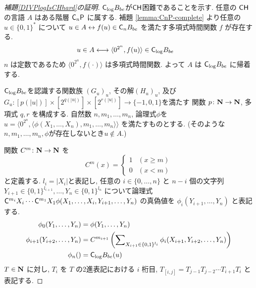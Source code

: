 \begin{proof}[\textup{補題\ref{DIVPlogIsCHhard}の証明}]
 $\mathsf{C}_{\log} B_{be}$が$\mathsf{CH}$困難であることを示す.
 任意の $\mathsf{CH}$ の言語 $A$ はある階層 $\mathsf{C}_n \mathsf{P}$ に属する. 
 補題 \ref{lemma:CnP-complete} より任意の $u \in \{0,1\}^*$ について
 $u \in A \leftrightarrow f(u) \in \mathsf{C}_n B_{be}$ 
 を満たす多項式時間関数 $f$ が存在する.
 \begin{align}
  u \in A 
  & \longleftrightarrow \langle 0^{2^n}, f(u) \rangle \in \mathsf{C}_{\log} B_{be}
 \end{align}
 $n$ は定数であるため $\langle 0^{2^n}, f(\cdot) \rangle$ は多項式時間関数.
 よって $A$ は $\mathsf{C}_{\log} B_{be}$ に帰着する.


 $\mathsf{C}_{\log} B_{be}$を認識する関数族 $(G_u)_u$,  その解$(H_u)_u$,
 及び$G_u \colon [p(|u|)] \times [2^{q(|u|)}] \times [2^{r(|u|)}] \to \{-1, 0, 1\}$を満たす
 関数 $p \colon \mathbf N \to \mathbf N$, 多項式 $q,r$ を構成する.
 自然数 $n, m_1, \dots, m_n$, 論理式$\phi$を
 $u  = \langle 0^{2^n}, 
 \langle \phi(X_1, \dots, X_n), m_1, \dots, m_n \rangle \rangle$
 を満たすものとする. 
 (そのような$n, m_1, \dots, m_n, \phi$が存在しないとき$u \not \in A$.)
 
 
 関数 $C^m \colon \mathbf N \to \mathbf N$ を
 \begin{equation}
  C^m(x) 
     = \begin{cases}
       1 & (x \ge m) \\
       0 & (x < m) \end{cases}
 \end{equation}
 と定義する. 
 $l_i = |X_i|$と表記し,
 任意の $i \in \{0, \dots, n\}$ と $n-i$ 個の文字列 
 $Y_{i+1} \in \{0,1\}^{l_{i+1}}, \dots, Y_n \in \{0,1\}^{l_n}$ 
 について論理式
 $\mathsf{C}^{m_{i}}{X_i} \cdots \mathsf{C}^{m_1}{X_1}
 \phi(X_1, \dots, X_i, Y_{i+1}, \dots, Y_n)$
 の真偽値を $\phi_i(Y_{i+1}, \dots, Y_n)$ と表記する.
 \begin{align}
  \phi_0 (Y_1, \dots, Y_n) &= \phi(Y_1, \dots, Y_n)
  \\ \label{eq:phi-step}
  \phi_{i+1}(Y_{i+2}, \dots, Y_n) 
  &= C^{m_{i+1}}\left(\sum\nolimits_{X_{i+1} \in \{0,1\}^{l_i}} 
  \phi_i(X_{i+1}, Y_{i+2}, \dots, Y_{n})\right) 
  \\
  \phi_n() &= \mathsf{C}_{\log} B_{be} (u) 
 \end{align}
 $T \in \mathbf N$ に対し, $T_i$ を $T$ の2進表記における $i$ 桁目, 
 $T_{[i,j]} = T_{j-1} T_{j-2} \cdots T_{i+1} T_{i}$ と表記する.



\end{proof}
